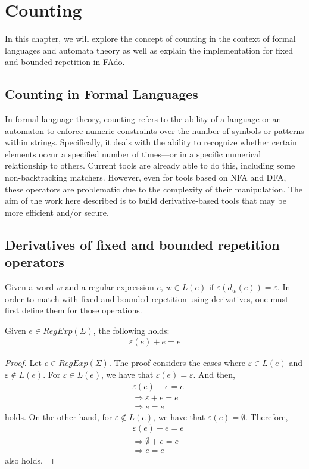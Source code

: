 \chapter{Counting}\label{chap:counting}
In this chapter, we will explore the concept of counting in the context of formal languages and automata theory as well as explain the implementation for fixed and bounded repetition in FAdo.

\section{Counting in Formal Languages}
In formal language theory, counting refers to the ability of a language or an automaton to enforce numeric constraints over the number of symbols or patterns within strings. Specifically, it deals with the ability to recognize whether certain elements occur a specified number of times—or in a specific numerical relationship to others.
Current tools are already able to do this, including some non-backtracking matchers. However, even for tools based on NFA and DFA, these operators are problematic due to the complexity of their manipulation. The aim of the work here described is to build derivative-based tools that may be more efficient and/or secure. 

\section{Derivatives of fixed and bounded repetition operators} %
Given a word $w$ and a regular expression $e$, $w \in L(e)$ if $\varepsilon(d_w(e)) = \varepsilon$.
In order to match with fixed and bounded repetition using derivatives, one must first define them for those operations.

\begin{thm}
	Given $e \in RegExp(\Sigma)$, the following holds:
	\begin{align*}
		\varepsilon(e) + e = e
	\end{align*}
\end{thm}
\begin{proof}
	Let $e \in RegExp(\Sigma)$. The proof considers the cases where $\varepsilon \in L(e)$ and $\varepsilon \notin L(e)$.
	For $\varepsilon \in L(e)$, we have that $\varepsilon(e) = \varepsilon$. And then,
	\begin{align*}
		& \varepsilon(e) + e = e \\
		& \Rightarrow \varepsilon + e = e \\
		& \Rightarrow e = e
	\end{align*}
	holds. On the other hand, for $\varepsilon \notin L(e)$, we have that $\varepsilon(e) = \emptyset$. Therefore,
	\begin{align*}
		& \varepsilon(e) + e = e \\
		& \Rightarrow \emptyset + e = e \\
		& \Rightarrow e = e
	\end{align*}
	also holds.
\end{proof}

